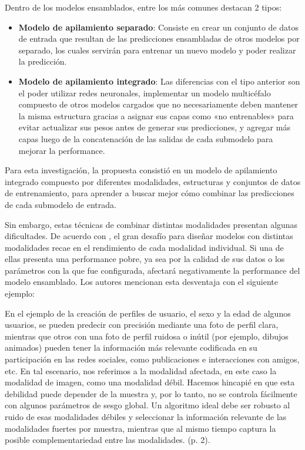 Dentro de los modelos ensamblados, entre los más comunes destacan 2 tipos:
\begin{itemize}
	\item \textbf{Modelo de apilamiento separado}: Consiste en crear un conjunto de datos de entrada que resultan de las predicciones ensambladas de otros modelos por separado, los cuales servirán para entrenar un nuevo modelo y poder realizar la predicción. 
	\item \textbf{Modelo de apilamiento integrado}: Las diferencias con el tipo anterior son el poder utilizar redes neuronales, implementar un modelo multicéfalo compuesto de otros modelos cargados que no necesariamente deben mantener la misma estructura gracias a asignar sus capas como «no entrenables» para evitar actualizar sus pesos antes de generar sus predicciones, y agregar más capas luego de la concatenación de las salidas de cada submodelo para mejorar la performance.
\end{itemize}

Para esta investigación, la propuesta consistió en un modelo de apilamiento integrado compuesto por diferentes modalidades, estructuras y conjuntos de datos de entrenamiento, para aprender a buscar mejor cómo combinar las predicciones de cada submodelo de entrada.

Sin embargo, estas técnicas de combinar distintas modalidades presentan algunas dificultades. De acuerdo con \cite{tec_liu2018multideeplearning}, el gran desafío para diseñar modelos con distintas modalidades recae en el rendimiento de cada modalidad individual. Si una de ellas presenta una performance pobre, ya sea por la calidad de sus datos o los parámetros con la que fue configurada, afectará negativamente la performance del modelo ensamblado. Los autores mencionan esta desventaja con el siguiente ejemplo:
\begin{center}
	\begin{minipage}{0.9\linewidth}
		\vspace{5pt}%
		{\small
			En el ejemplo de la creación de perfiles de usuario, el sexo y la edad de algunos usuarios, se pueden predecir con precisión mediante una foto de perfil clara, mientras que otros con una foto de perfil ruidosa o inútil (por ejemplo, dibujos animados) pueden tener la información más relevante codificada en su participación en las redes sociales, como publicaciones e interacciones con amigos, etc. En tal escenario, nos referimos a la modalidad afectada, en este caso la modalidad de imagen, como una modalidad débil. Hacemos hincapié en que esta debilidad puede depender de la muestra y, por lo tanto, no se controla fácilmente con algunos parámetros de sesgo global. Un algoritmo ideal debe ser robusto al ruido de esas modalidades débiles y seleccionar la información relevante de las modalidades fuertes por muestra, mientras que al mismo tiempo captura la posible complementariedad entre las modalidades. (p. 2).
		}
		\vspace{5pt}%
	\end{minipage}
\end{center}

